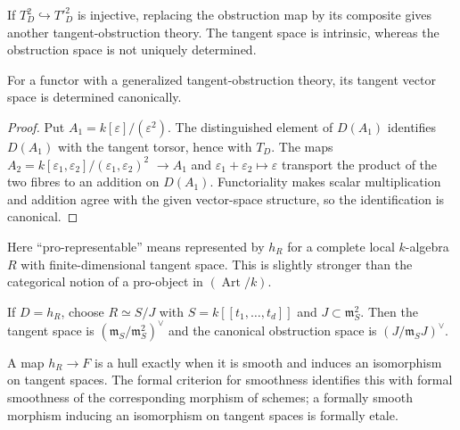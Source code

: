 \begin{remark}\label{fga-rem-6-1-22}
If $T^2_D\hookrightarrow T'^2_D$ is injective, replacing the obstruction map by
its composite gives another tangent-obstruction theory.  The tangent space is
intrinsic, whereas the obstruction space is not uniquely determined.
\end{remark}

\begin{proposition}\label{fga-pro-6-1-23}
For a functor with a generalized tangent-obstruction theory, its tangent vector
space is determined canonically.
\end{proposition}
\begin{proof}
Put $A_1=k[\varepsilon]/(\varepsilon^2)$.  The distinguished element of
$D(A_1)$ identifies $D(A_1)$ with the tangent torsor, hence with $T_D$.
The maps $A_2=k[\varepsilon_1,\varepsilon_2]/(\varepsilon_1,\varepsilon_2)^2$
$\to A_1$ and $\varepsilon_1+\varepsilon_2\mapsto\varepsilon$ transport the
product of the two fibres to an addition on $D(A_1)$.  Functoriality makes scalar
multiplication and addition agree with the given vector-space structure, so the
identification is canonical.
\end{proof}

\begin{remark}\label{fga-rem-6-2-2}
Here ``pro-representable'' means represented by $h_R$ for a complete local
$k$-algebra $R$ with finite-dimensional tangent space.  This is slightly
stronger than the categorical notion of a pro-object in $(\operatorname{Art}/k)$.
\end{remark}

\begin{remark}\label{fga-rem-6-2-3}
If $D=h_R$, choose $R\simeq S/J$ with $S=k[[t_1,\ldots,t_d]]$ and
$J\subset\mathfrak m_S^2$.  Then the tangent space is
$(\mathfrak m_S/\mathfrak m_S^2)^\vee$ and the canonical obstruction space is
$(J/\mathfrak m_SJ)^\vee$.
\end{remark}

\begin{remark}\label{fga-rem-6-3-2}
A map $h_R\to F$ is a hull exactly when it is smooth and induces an isomorphism
on tangent spaces.  The formal criterion for smoothness identifies this with
formal smoothness of the corresponding morphism of schemes; a formally smooth
morphism inducing an isomorphism on tangent spaces is formally etale.
\end{remark}

